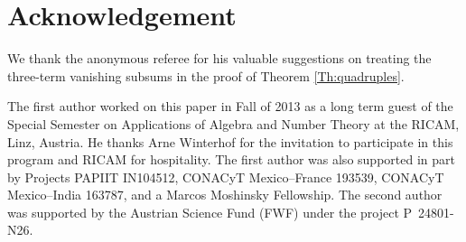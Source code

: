\documentclass{amsart}
\theoremstyle{remark}
\begin{document}
\section*{Acknowledgement}

We thank the anonymous referee for his valuable suggestions on treating the three-term vanishing subsums in the proof of Theorem \ref{Th:quadruples}.

The first author worked on this paper in Fall of 2013 as a long term guest of  the Special Semester on Applications of Algebra and Number Theory at the 
RICAM, Linz, Austria. He thanks Arne Winterhof for the invitation to participate in this program and RICAM for hospitality. The first author was also supported 
in part by Projects PAPIIT IN104512, CONACyT Mexico--France 193539, CONACyT Mexico--India 163787, and a Marcos Moshinsky Fellowship. The second author was 
supported by the Austrian Science Fund (FWF) under the project P~24801-N26.
\end{document}
